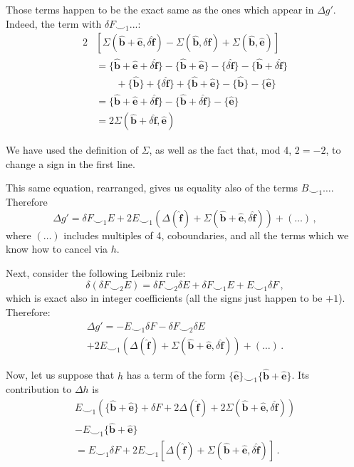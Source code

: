 \documentclass[aps,twocolumn,prx,floatfix,preprintnumbers, nofootinbib,10pt]{revtex4-2}
\numberwithin{equation}{section}
\theoremstyle{definition}
\theoremstyle{remark}
\theoremstyle{claim}
\newcommand{\be}{\begin{equation}}
\newcommand{\ee}{\end{equation}}
\newcommand{\paren}[1]{\left( #1 \right)}
\newcommand{\sqpar}[1]{\left[ #1 \right]}
\begin{document}
Those terms happen to be the exact same as the ones which appear in $\Delta g'$. Indeed, the term with $\delta F \smile_1 ...$:
\begin{align}
 2 &\sqpar{ \Sigma(\bm{\hat{b}} + \bm{\hat{e}}, \delta \bm{\hat{f}}) - \Sigma(\bm{\hat{b}}, \delta \bm{\hat{f}}) + \Sigma(\bm{\hat{b}}, \bm{\hat{e}})} \nonumber \\
 &= \{\bm{\hat{b}} + \bm{\hat{e}} + \delta \bm{\hat{f}} \} - \{ \bm{\hat{b}} + \bm{\hat{e}} \} - \{ \delta \bm{\hat{f}} \} - \{ \bm{\hat{b}} + \delta \bm{\hat{f}} \} \nonumber \\
 &\hspace{2em} + \{ \bm{\hat{b}} \} + \{ \delta \bm{\hat{f}} \} + \{ \bm{\hat{b}} + \bm{\hat{e}} \} - \{ \bm{\hat{b}} \} - \{ \bm{\hat{e}} \} \nonumber \\
 &= \{\bm{\hat{b}} + \bm{\hat{e}} + \delta \bm{\hat{f}} \} - \{ \bm{\hat{b}} + \delta \bm{\hat{f}} \} - \{ \bm{\hat{e}} \} \nonumber \\
 &= 2 \Sigma(\bm{\hat{b}} + \delta \bm{\hat{f}}, \bm{\hat{e}})
\end{align}

We have used the definition of $\Sigma$, as well as the fact that, mod 4, $2 = -2$, to change a sign in the first line.

This same equation, rearranged, gives us equality also of the terms $B \smile_1 \dots$. Therefore
\be
\Delta g' = \delta F \smile_1 E + 2 E \smile_1 \paren{\Delta(\bm{\hat{f}}) + \Sigma(\bm{\hat{b}} + \bm{\hat{e}}, \delta \bm{\hat{f}})} + (\dots) \,,
\ee
where $(\dots)$ includes multiples of 4, coboundaries, and all the terms which we know how to cancel via $h$.

Next, consider the following Leibniz rule:
\be
\delta (\delta F \smile_2 E) = \delta F \smile_2 \delta E + \delta F \smile_1 E + E \smile_1 \delta F \,,
\ee
which is exact also in integer coefficients (all the signs just happen to be $+1$). Therefore:
\begin{multline}
 \Delta g' = - E \smile_1 \delta F - \delta F \smile_2 \delta E \\
 + 2 E \smile_1 \paren{\Delta(\bm{\hat{f}}) + \Sigma(\bm{\hat{b}} + \bm{\hat{e}}, \delta \bm{\hat{f}})} + (\dots) \,.
\end{multline}

Now, let us suppose that $h$ has a term of the form $\{ \bm{\hat{e}} \} \smile_1 \{ \bm{\hat{b}} + \bm{\hat{e}} \}$. Its contribution to $\Delta h$ is
\begin{multline}
 E \smile_1 \paren{\{ \bm{\hat{b}} + \bm{\hat{e}} \} + \delta F + 2 \Delta(\bm{\hat{f}}) + 2 \Sigma(\bm{\hat{b}} + \bm{\hat{e}}, \delta \bm{\hat{f}}) } \\
 - E \smile_1 \{\bm{\hat{b}} + \bm{\hat{e}}\} \\
 = E \smile_1 \delta F + 2 E \smile_1 \sqpar{\Delta(\bm{\hat{f}}) + \Sigma(\bm{\hat{b}} + \bm{\hat{e}}, \delta \bm{\hat{f}})} \,.
\end{multline}
\end{document}

